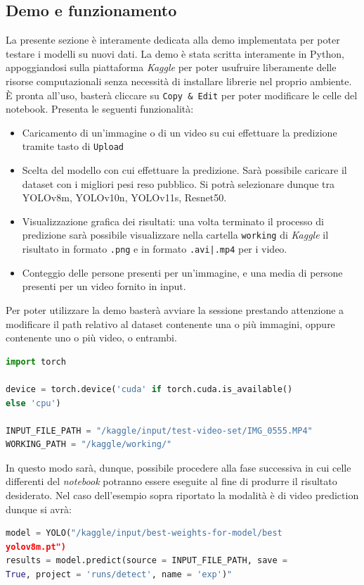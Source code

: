 \documentclass[12pt]{article}
\begin{document}
\subsection{Demo e funzionamento}
La presente sezione è interamente dedicata alla demo implementata per poter testare i modelli su nuovi dati. La demo è stata scritta interamente in Python, appoggiandosi sulla piattaforma \textit{Kaggle} per poter usufruire liberamente delle risorse computazionali senza necessità di installare librerie nel proprio ambiente. È pronta all'uso, basterà cliccare su \texttt{Copy \& Edit} per poter modificare le celle del notebook. Presenta le seguenti funzionalità:
\begin{itemize}
    \item Caricamento di un'immagine o di un video su cui effettuare la predizione tramite tasto di \texttt{Upload}
    \item Scelta del modello con cui effettuare la predizione. Sarà possibile caricare il dataset con i migliori pesi reso pubblico. Si potrà selezionare dunque tra YOLOv8m, YOLOv10n, YOLOv11s, Resnet50.
    \item Visualizzazione grafica dei risultati: una volta terminato il processo di predizione sarà possibile visualizzare nella cartella \texttt{working} di \textit{Kaggle} il risultato in formato \texttt{.png} e in formato \texttt{.avi|.mp4} per i video.
    \item Conteggio delle persone presenti per un'immagine, e una media di persone presenti per un video fornito in input.
\end{itemize}
Per poter utilizzare la demo basterà avviare la sessione prestando attenzione a modificare il path relativo al dataset contenente una o più immagini, oppure contenente uno o più video, o entrambi. 
\begin{lstlisting}[language=Python, caption={Path relativo al dataset}, label={lst:path-demo}]
import torch

device = torch.device('cuda' if torch.cuda.is_available() 
else 'cpu')
 
INPUT_FILE_PATH = "/kaggle/input/test-video-set/IMG_0555.MP4"
WORKING_PATH = "/kaggle/working/"
\end{lstlisting}
In questo modo sarà, dunque, possibile procedere alla fase successiva in cui celle differenti del \textit{notebook} potranno essere eseguite al fine di produrre il risultato desiderato. Nel caso dell'esempio sopra riportato la modalità è di video prediction dunque si avrà:\\
\begin{lstlisting}[language=Python, caption={Esempio di video predict su YOLOv8m}, label={lst:video-demo}]
model = YOLO("/kaggle/input/best-weights-for-model/best 
yolov8m.pt")
results = model.predict(source = INPUT_FILE_PATH, save = 
True, project = 'runs/detect', name = 'exp')"
\end{lstlisting}
\end{document}
